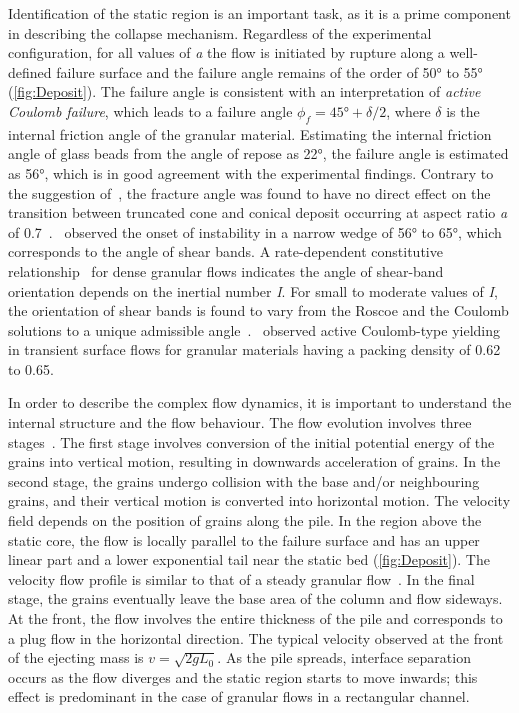 Identification of the static region is an important task, as it is a prime 
component in describing the collapse mechanism. Regardless of the experimental 
configuration, for all values of \textit{a} the flow is initiated by rupture 
along a well-defined failure surface and the failure angle remains of the order 
of 50\si{\degree} to 55\si{\degree} (\cref{fig:Deposit}). The failure angle is 
consistent with an interpretation of \textit{active Coulomb failure}, which 
leads to a failure 
angle $\phi_{\textit{f}}=45\si{\degree} +\delta / 2$, where $\delta$ is the 
internal 
friction angle of the granular material. Estimating the internal friction angle 
of glass beads from the angle of repose as 22\si{\degree}, the failure angle is 
estimated as 56\si{\degree}, which is in good agreement with the experimental 
findings. Contrary to the suggestion of~\citet{Lajeunesse2004}, the fracture 
angle was found to have no direct effect on the transition between truncated 
cone and conical deposit occurring at aspect ratio \textit{a} of 
0.7~\citep{Lajeunesse2005}.~\citet{Schaeffer1990} observed the onset of 
instability in a narrow wedge of 56\si{\degree} to 
65\si{\degree}, which corresponds to the angle of shear bands. A 
rate-dependent constitutive relationship~\citep{Jop2006} for dense granular 
flows indicates the angle of shear-band orientation depends on the inertial 
number \textit{I}. For small to moderate values of \textit{I}, the orientation 
of shear bands is found to vary from the Roscoe and the Coulomb solutions to a 
unique admissible angle~\citep{Lemiale2011}.~\citet{Daerr1999} observed active 
Coulomb-type yielding in transient surface flows for granular materials having 
a packing density of 0.62 to 0.65. 


In order to describe the complex flow dynamics, it is important to understand 
the internal structure and the flow behaviour. 
The flow evolution involves three stages~\citep{Staron2007a}. 
The first stage involves conversion of the initial potential energy of the 
grains into vertical motion, resulting in downwards acceleration of grains. In 
the second stage, the grains undergo collision with the base and/or 
neighbouring grains, and their vertical motion is converted into horizontal 
motion. The velocity field depends on the position of grains along the 
pile. In the region above the static core, the 
flow is locally parallel to the failure surface and has an upper linear part 
and a lower exponential tail near the static bed (\cref{fig:Deposit}). The 
velocity flow profile is similar to that of a steady granular 
flow~\citep{Midi2004}. In the final 
stage, the grains eventually leave the base area of the column and flow 
sideways. At the 
front, the flow involves the entire thickness of the pile and corresponds to a 
plug flow in the horizontal direction. The typical 
velocity observed at the front of the ejecting mass is 
$\textit{v}=\sqrt{2\textit{g}\textit{L}_{\textit{0}}}$. As the pile spreads, 
interface separation occurs as the 
flow diverges and the static region starts to move inwards; this effect is 
predominant in the case of granular flows in a rectangular channel. 

